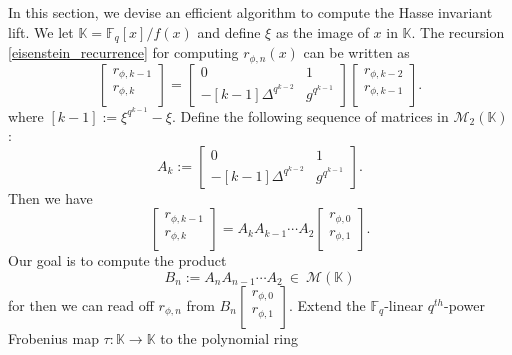 \documentclass[12pt]{article}
\theoremstyle{plain}
\theoremstyle{definition}
\def\F{\ensuremath{\mathbb{F}}}
\def\K{\ensuremath{\mathbb{K}}}
\begin{document}
In this section, we devise an efficient algorithm to compute the Hasse invariant lift. We let $\K = 
\F_q[x]/f(x)$ and define $\xi$ as the image of $x$ in $\K$. The recursion  
\ref{eisenstein_recurrence} for computing $r_{\phi,n}(x)$ can be written as
\[
\begin{bmatrix}
r_{\phi,k - 1} \\
r_{\phi,k} \\
\end{bmatrix} = 
\begin{bmatrix}
0 & 1 \\
-[k - 1]\Delta^{q^{k - 2}} & g^{q^{k - 1}}
\end{bmatrix}
\begin{bmatrix}
r_{\phi,k - 2} \\
r_{\phi,k - 1} \\
\end{bmatrix}.
\]
where $[k - 1]:=\xi^{q^{k - 1}}-\xi$. Define the following sequence of matrices in 
$\mathscr{M}_2(\K)$:
\[
A_k :=\begin{bmatrix}
0 & 1 \\
-[k - 1]\Delta^{q^{k - 2}} & g^{q^{k - 1}}
\end{bmatrix}.
\]
Then we have
\[
\begin{bmatrix}
r_{\phi,k - 1} \\
r_{\phi,k} \\
\end{bmatrix} = 
A_kA_{k - 1} \cdots A_2
\begin{bmatrix}
r_{\phi,0} \\
r_{\phi,1} \\
\end{bmatrix}.
\]
Our goal is to compute the product 
\[B_n := A_nA_{n - 1} \cdots A_2 ~ \in ~ \mathscr{M}(\K)\]
for then we can read off $r_{\phi,n}$ from $B_n\begin{bmatrix}
r_{\phi,0} \\
r_{\phi,1} \\
\end{bmatrix}.$ 
Extend the $\F_q$-linear $q^{th}$-power Frobenius map $\tau: \K \to \K$ to the polynomial ring 
\end{document}
